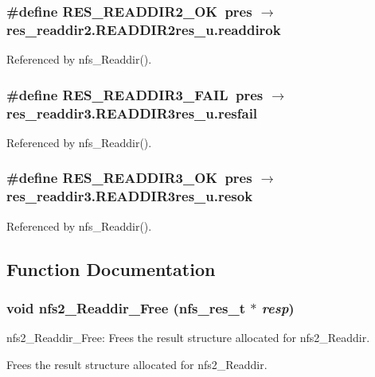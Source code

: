 \subsubsection{\setlength{\rightskip}{0pt plus 5cm}\#define RES\_\-READDIR2\_\-OK\ pres $\rightarrow$ res\_\-readdir2.READDIR2res\_\-u.readdirok}\label{nfs__Readdir_8c_a0}




Referenced by nfs\_\-Readdir().
\subsubsection{\setlength{\rightskip}{0pt plus 5cm}\#define RES\_\-READDIR3\_\-FAIL\ pres $\rightarrow$ res\_\-readdir3.READDIR3res\_\-u.resfail}\label{nfs__Readdir_8c_a2}




Referenced by nfs\_\-Readdir().
\subsubsection{\setlength{\rightskip}{0pt plus 5cm}\#define RES\_\-READDIR3\_\-OK\ pres $\rightarrow$ res\_\-readdir3.READDIR3res\_\-u.resok}\label{nfs__Readdir_8c_a1}




Referenced by nfs\_\-Readdir().

\subsection{Function Documentation}
\subsubsection{\setlength{\rightskip}{0pt plus 5cm}void nfs2\_\-Readdir\_\-Free (nfs\_\-res\_\-t $\ast$ {\em resp})}\label{nfs__Readdir_8c_a4}


nfs2\_\-Readdir\_\-Free: Frees the result structure allocated for nfs2\_\-Readdir.

Frees the result structure allocated for nfs2\_\-Readdir.

